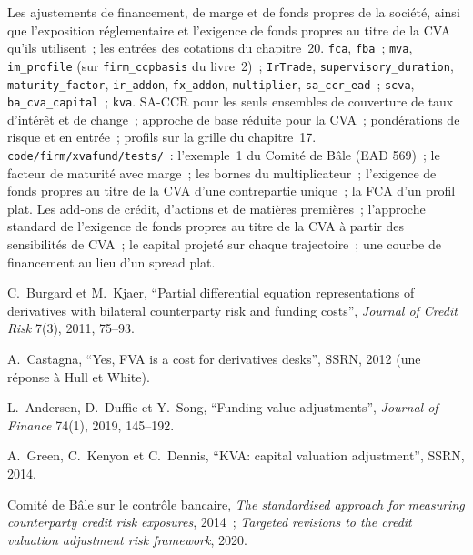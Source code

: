 \begin{build}
 Les ajustements de financement, de marge et de fonds propres de la société, ainsi que l'exposition
réglementaire et l'exigence de fonds propres au titre de la CVA qu'ils utilisent~; les entrées des cotations du chapitre~20.
 \texttt{fca}, \texttt{fba}~; \texttt{mva}, \texttt{im\_profile} (sur
\texttt{firm\_ccpbasis} du livre~2)~; \texttt{IrTrade}, \texttt{supervisory\_duration},
\texttt{maturity\_factor}, \texttt{ir\_addon}, \texttt{fx\_addon}, \texttt{multiplier},
\texttt{sa\_ccr\_ead}~; \texttt{scva}, \texttt{ba\_cva\_capital}~; \texttt{kva}.
 SA-CCR pour les seuls ensembles de couverture de taux d'intérêt et de change~; approche de base réduite pour la CVA~;
pondérations de risque et  en entrée~; profils sur la grille du chapitre~17.
 \texttt{code/firm/xvafund/tests/}~: l'exemple~1 du Comité de Bâle
(EAD 569)~; le facteur de maturité avec marge~; les bornes du multiplicateur~; l'exigence de fonds propres au titre de la CVA d'une contrepartie unique~;
la FCA d'un profil plat.
 Les add-ons de crédit, d'actions et de matières premières~; l'approche standard de l'exigence de fonds propres au titre de la CVA
à partir des sensibilités de CVA~; le capital projeté sur chaque trajectoire~; une courbe de financement au lieu
d'un spread plat.
\end{build}

\begin{omsources}
\item C.\ Burgard et M.\ Kjaer, ``Partial differential equation representations of
derivatives with bilateral counterparty risk and funding costs'', \emph{Journal of Credit
Risk} 7(3), 2011, 75--93.
\item A.\ Castagna, ``Yes, FVA is a cost for derivatives desks'', SSRN, 2012 (une réponse à Hull
et White).
\item L.\ Andersen, D.\ Duffie et Y.\ Song, ``Funding value adjustments'', \emph{Journal of
Finance} 74(1), 2019, 145--192.
\item A.\ Green, C.\ Kenyon et C.\ Dennis, ``KVA: capital valuation adjustment'', SSRN, 2014.
\item Comité de Bâle sur le contrôle bancaire, \emph{The standardised approach for measuring
counterparty credit risk exposures}, 2014~; \emph{Targeted revisions to the credit valuation
adjustment risk framework}, 2020.
\end{omsources}

